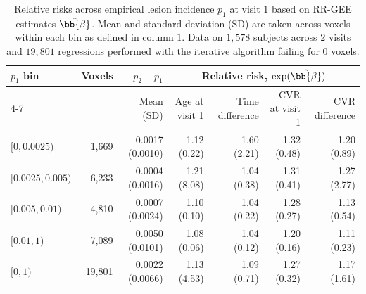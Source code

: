 \begin{table}[htbp]
\centering
\caption{Relative risks across empirical lesion incidence $p_1$ at visit $1$ based on RR-GEE estimates $\hat{\bb{\beta}}$. Mean and standard deviation (SD) are taken across voxels within each bin as defined in column $1$. Data on $1{,}578$ subjects across $2$ visits and $19{,}801$ regressions performed with the iterative algorithm failing for $0$ voxels.}
\label{tab:rr-gee-relative-risk-by-incidence}
\setlength{\tabcolsep}{5pt}
\renewcommand{\arraystretch}{1.12}
\begin{tabular}{lrrrrrr}
\toprule
$p_1$ bin & Voxels & $p_2 - p_1$ & \multicolumn{4}{c}{Relative risk, $\exp(\hat{\bb{\beta}})$} \\
\cmidrule(lr){4-7}
& & Mean (SD) & Age at visit 1 & Time difference & CVR at visit 1 & CVR difference \\
\midrule
$[0, 0.0025)$ & 1,669 & 0.0017 (0.0010) & 1.12 (0.22) & 1.60 (2.21) & 1.32 (0.48) & 1.20 (0.89) \\
$[0.0025, 0.005)$ & 6,233 & 0.0004 (0.0016) & 1.21 (8.08) & 1.04 (0.38) & 1.31 (0.41) & 1.27 (2.77) \\
$[0.005, 0.01)$ & 4,810 & 0.0007 (0.0024) & 1.10 (0.10) & 1.04 (0.22) & 1.28 (0.27) & 1.13 (0.54) \\
$[0.01, 1)$ & 7,089 & 0.0050 (0.0101) & 1.08 (0.06) & 1.04 (0.12) & 1.20 (0.16) & 1.11 (0.23) \\
\midrule
$[0, 1)$ & 19,801 & 0.0022 (0.0066) & 1.13 (4.53) & 1.09 (0.71) & 1.27 (0.32) & 1.17 (1.61) \\
\bottomrule
\end{tabular}
\end{table}
